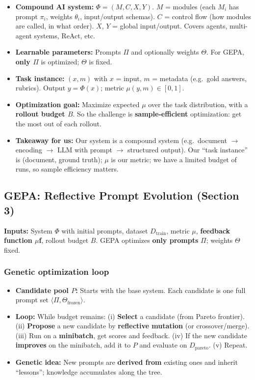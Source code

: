 \documentclass[11pt,a4paper]{article}
\begin{document}
\begin{itemize}
  \item \textbf{Compound AI system:} $\Phi = (M, C, X, Y)$. $M$ = modules (each $M_i$ has prompt $\pi_i$, weights $\theta_i$, input/output schemas). $C$ = control flow (how modules are called, in what order). $X$, $Y$ = global input/output. Covers agents, multi-agent systems, ReAct, etc.
  \item \textbf{Learnable parameters:} Prompts $\Pi$ and optionally weights $\Theta$. For GEPA, \textbf{only $\Pi$} is optimized; $\Theta$ is fixed.
  \item \textbf{Task instance:} $(x, m)$ with $x$ = input, $m$ = metadata (e.g.\ gold answers, rubrics). Output $y = \Phi(x)$; metric $\mu(y, m) \in [0, 1]$.
  \item \textbf{Optimization goal:} Maximize expected $\mu$ over the task distribution, with a \textbf{rollout budget $B$}. So the challenge is \textbf{sample-efficient} optimization: get the most out of each rollout.
  \item \textbf{Takeaway for us:} Our system is a compound system (e.g.\ document $\to$ encoding $\to$ LLM with prompt $\to$ structured output). Our ``task instance'' is (document, ground truth); $\mu$ is our metric; we have a limited budget of runs, so sample efficiency matters.
\end{itemize}

\subsection{GEPA: Reflective Prompt Evolution (Section 3)}

\textbf{Inputs:} System $\Phi$ with initial prompts, dataset $D_{\mathrm{train}}$, metric $\mu$, \textbf{feedback function $\mu$f}, rollout budget $B$. GEPA optimizes \textbf{only prompts} $\Pi$; weights $\Theta$ fixed.

\subsubsection{Genetic optimization loop}

\begin{itemize}
  \item \textbf{Candidate pool $P$:} Starts with the base system. Each candidate is one full prompt set $\langle \Pi, \Theta_{\mathrm{frozen}} \rangle$.
  \item \textbf{Loop:} While budget remains: (i) \textbf{Select} a candidate (from Pareto frontier). (ii) \textbf{Propose} a new candidate by \textbf{reflective mutation} (or crossover/merge). (iii) Run on a \textbf{minibatch}, get scores and feedback. (iv) If the new candidate \textbf{improves} on the minibatch, add it to $P$ and evaluate on $D_{\mathrm{pareto}}$. (v) Repeat.
  \item \textbf{Genetic idea:} New prompts are \textbf{derived from} existing ones and inherit ``lessons''; knowledge accumulates along the tree.
\end{itemize}
\end{document}
